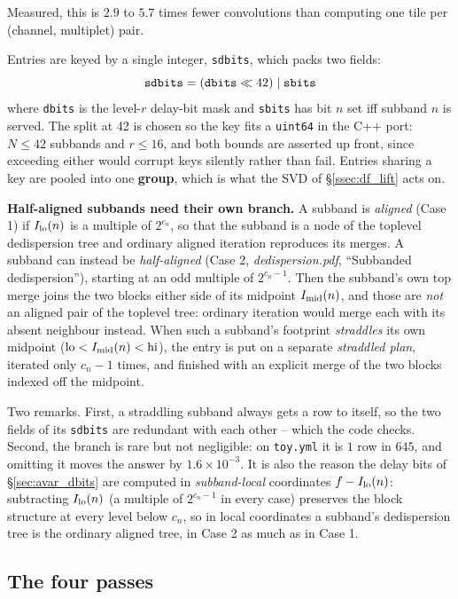 \documentclass{article}
\numberwithin{equation}{section}   %
\newcommand{\ddnotes}[1]{{\em dedispersion.pdf}, ``#1''}
\begin{document}
Measured, this is $2.9$ to $5.7$ times fewer convolutions than computing one tile per
(channel, multiplet) pair.

Entries are keyed by a single integer, {\tt sdbits}, which packs two fields:
\begin{equation}
{\tt sdbits} = ({\tt dbits} \ll 42) \; | \; {\tt sbits}
\end{equation}
where {\tt dbits} is the level-$r$ delay-bit mask and {\tt sbits} has bit $n$ set iff subband $n$
is served. The split at 42 is chosen so the key fits a {\tt uint64} in the C++ port: $N \le 42$
subbands and $r \le 16$, and both bounds are asserted up front, since exceeding either would
corrupt keys silently rather than fail. Entries sharing a key are pooled into one {\bf group},
which is what the SVD of \S\ref{ssec:df_lift} acts on.

{\bf Half-aligned subbands need their own branch.} A subband is {\em aligned} (Case 1) if
$I_{\rm lo}(n)$ is a multiple of $2^{c_n}$, so that the subband is a node of the toplevel
dedispersion tree and ordinary aligned iteration reproduces its merges. A subband can instead be
{\em half-aligned} (Case 2, \ddnotes{Subbanded dedispersion}), starting at an odd multiple of
$2^{c_n - 1}$. Then the subband's own top merge joins the two blocks either side of its midpoint
$I_{\rm mid}(n)$, and those are {\em not} an aligned pair of the toplevel tree: ordinary
iteration would merge each with its absent neighbour instead. When such a subband's footprint
{\em straddles} its own midpoint (${\rm lo} < I_{\rm mid}(n) < {\rm hi}$), the entry is put on a
separate {\em straddled plan}, iterated only $c_n - 1$ times, and finished with an explicit merge
of the two blocks indexed off the midpoint.

Two remarks. First, a straddling subband always gets a row to itself, so the two fields of its
{\tt sdbits} are redundant with each other -- which the code checks. Second, the branch is rare
but not negligible: on {\tt toy.yml} it is $1$ row in $645$, and omitting it moves the answer by
$1.6\times 10^{-3}$. It is also the reason the delay bits of \S\ref{sec:avar_dbits} are computed
in {\em subband-local} coordinates $f - I_{\rm lo}(n)$: subtracting $I_{\rm lo}(n)$ (a multiple of
$2^{c_n-1}$ in every case) preserves the block structure at every level below $c_n$, so in local
coordinates a subband's dedispersion tree is the ordinary aligned tree, in Case 2 as much as in
Case 1.

\subsection{The four passes}
\label{ssec:df_passes}
\end{document}

